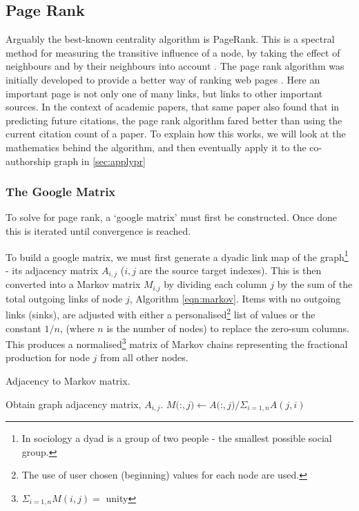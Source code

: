 \subsection{Page Rank}\label{sec:pagerank}
Arguably the best-known centrality algorithm is PageRank. This is a spectral method for measuring the transitive influence of a node, by taking the effect of neighbours and by their neighbours into account \citep{neoj4}. The page rank algorithm was initially developed to provide a better way of ranking web pages \citep{google}. Here an important page is not only one of many links, but links to other important sources. In the context of academic papers, that same paper also found that in predicting future citations, the page rank algorithm fared better than using the current citation count of a paper.
To explain how this works, we will look at the mathematics behind the algorithm, and then eventually apply it to the co-authorship graph in \autoref{sec:applypr}

\subsubsection{The Google Matrix}
To solve for page rank, a `google matrix' must first be constructed. Once done this is iterated until convergence is reached.

To build a google matrix, we must first generate a dyadic link map of the graph\footnote{In sociology a dyad is a group of two people - the smallest possible social group.} - its adjacency matrix $A_{i,j}$ ($i,j$ are the source target indexes). This is then converted into a Markov matrix $M_{i.j}$ by dividing each column $j$ by the sum of the total outgoing links of node $j$, Algorithm \ref{eqn:markov}.
Items with no outgoing links (sinks), are adjusted with either a personalised\footnote{The use of user chosen (beginning) values for each node are used.} list of values or the constant $1/n$, (where $n$ is the number of nodes) to replace the zero-sum columns. This produces a normalised\footnote{ \: $\Sigma_{i=1,n} M(i,j) = $ unity} matrix of Markov chains representing the fractional production for node $j$ from all other nodes.

\begin{algorithm} \caption{Adjacency to Markov matrix.}
\begin{algorithmic}[1]
\State Obtain graph adjacency matrix, $A_{i,j}$.
\Repeat
{}
\State $M($:$,j) \gets A($:$,j) / \Sigma_{i=1,n} A(j,i)$
\EndFor
{}

\end{algorithmic}\label{eqn:markov}
\end{algorithm}



